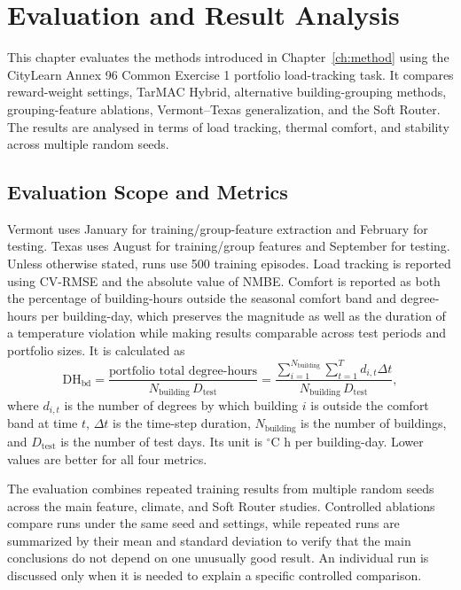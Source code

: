 \chapter{Evaluation and Result Analysis}\label{ch:eval}

This chapter evaluates the methods introduced in Chapter~\ref{ch:method} using
the CityLearn Annex 96 Common Exercise 1 portfolio load-tracking task. It
compares reward-weight settings, TarMAC Hybrid, alternative building-grouping
methods, grouping-feature ablations, Vermont--Texas generalization, and the Soft Router. The results are
analysed in terms of load tracking, thermal comfort, and stability across
multiple random seeds.


\section{Evaluation Scope and Metrics}

Vermont uses January for training/group-feature extraction and February for
testing. Texas uses August for training/group features and September for
testing. Unless otherwise stated, runs use 500 training episodes. Load tracking
is reported using CV-RMSE and the absolute value of NMBE. Comfort is reported as
both the percentage of building-hours outside the seasonal comfort band and
degree-hours per building-day, which preserves the magnitude as well as the
duration of a temperature violation while making results comparable across test
periods and portfolio sizes. It is calculated as
\begin{equation}
\label{eq:degree-hours-per-building-day}
\mathrm{DH}_{\mathrm{bd}}
=\frac{\text{portfolio total degree-hours}}
{N_{\mathrm{building}}\,D_{\mathrm{test}}}
=\frac{\sum_{i=1}^{N_{\mathrm{building}}}\sum_{t=1}^{T}d_{i,t}\Delta t}
{N_{\mathrm{building}}\,D_{\mathrm{test}}},
\end{equation}
where $d_{i,t}$ is the number of degrees by which building $i$ is outside the
comfort band at time $t$, $\Delta t$ is the time-step duration,
$N_{\mathrm{building}}$ is the number of buildings, and $D_{\mathrm{test}}$ is
the number of test days. Its unit is $^\circ$C h per building-day. Lower values
are better for all four metrics.

The evaluation combines repeated training results from multiple random seeds
across the main feature, climate, and Soft Router studies.
Controlled ablations compare runs under the same seed and settings, while
repeated runs are summarized by their mean and standard deviation to verify
that the main conclusions do not depend on one unusually good result. An
individual run is discussed only when it is needed to explain a specific
controlled comparison.


